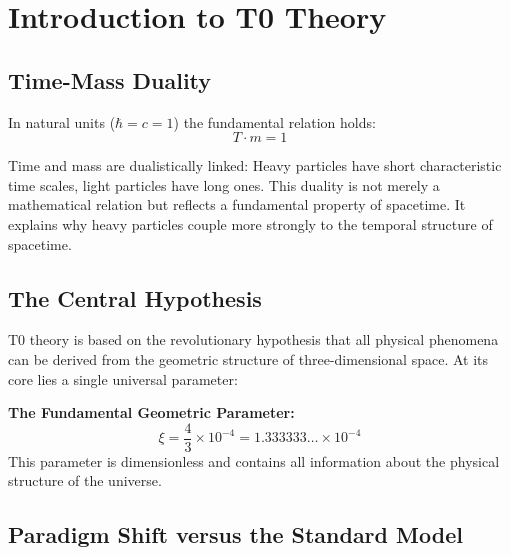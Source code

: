 \documentclass[12pt,a4paper]{article}
\begin{document}
	\tableofcontents
	
	\section{Introduction to T0 Theory}
	
	\subsection{Time-Mass Duality}
	
	In natural units ($\hbar = c = 1$) the fundamental relation holds:
	\begin{equation}
		T \cdot m = 1
		\label{eq:time_mass_duality}
	\end{equation}
	
	Time and mass are dualistically linked: Heavy particles have short characteristic time scales, light particles have long ones. This duality is not merely a mathematical relation but reflects a fundamental property of spacetime. It explains why heavy particles couple more strongly to the temporal structure of spacetime.
	
	\subsection{The Central Hypothesis}
	
	T0 theory is based on the revolutionary hypothesis that all physical phenomena can be derived from the geometric structure of three-dimensional space. At its core lies a single universal parameter:
	
	\begin{foundation}
		\textbf{The Fundamental Geometric Parameter:}
		\begin{equation}
			\boxed{\xi = \frac{4}{3} \times 10^{-4} = 1.333333\dots \times 10^{-4}}
			\label{eq:xi_fundamental}
		\end{equation}
		This parameter is dimensionless and contains all information about the physical structure of the universe.
	\end{foundation}
	
	\subsection{Paradigm Shift versus the Standard Model}
	
\end{document}
